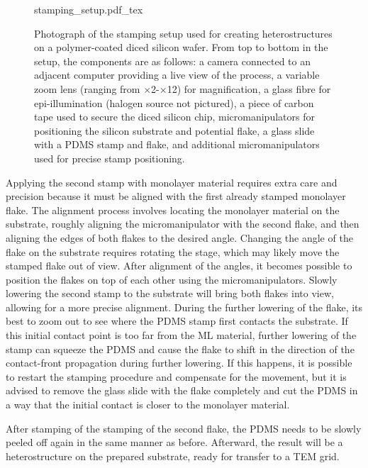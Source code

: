 \begin{figure}[h]
	\centering
	\def\svgwidth{1\linewidth}
	{stamping_setup.pdf_tex}
    \caption{Photograph of the stamping setup used for creating heterostructures on a polymer-coated diced silicon wafer. 
    From top to bottom in the setup, the components are as follows: a camera connected to an adjacent computer providing a live view of the process, a variable zoom lens (ranging from $\times$2\--$\times$12) for magnification, a glass fibre for epi-illumination (halogen source not pictured), a piece of carbon tape used to secure the diced silicon chip, micromanipulators for positioning the silicon substrate and potential flake, a glass slide with a PDMS stamp and flake, and additional micromanipulators used for precise stamp positioning.}
	\label{fig:stamping_set-up}
\end{figure}

Applying the second stamp with monolayer material requires extra care and precision because  it must be aligned with the first already stamped monolayer flake. 
%
The alignment process involves locating the monolayer material on the substrate, roughly aligning the micromanipulator with the second flake, and then aligning the edges of both flakes to the desired angle.
%
Changing the angle of the flake on the substrate requires rotating the stage, which may likely move the stamped flake out of view. 
%
After alignment of the angles, it becomes possible to position the flakes on top of each other using the micromanipulators. 
%
Slowly lowering the second stamp to the substrate will bring both flakes into view, allowing for a more precise alignment.
%
During the further lowering of the flake, its best to zoom out to see where the PDMS stamp first contacts the substrate. 
%
If this initial contact point is too far from the ML material, further lowering of the stamp can squeeze the PDMS and cause the flake to shift in the direction of the contact-front propagation during further lowering.
%
If this happens, it is possible to restart the stamping procedure and compensate for the movement, but it is advised to remove the glass slide with the flake completely and cut the PDMS in a way that the initial contact is closer to the monolayer material.

After stamping of the stamping of the second flake, the PDMS needs to be slowly peeled off again in the same manner as before.
%
Afterward, the result will be a heterostructure on the prepared substrate, ready for transfer to a TEM grid.

